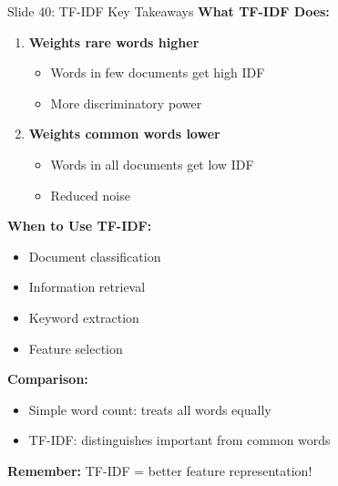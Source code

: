 \documentclass[8pt]{beamer}
\begin{document}
	\begin{frame}{Slide 40: TF-IDF Key Takeaways}
		\fontsize{6.5}{7.5}\selectfont
		\textbf{What TF-IDF Does:}
		\begin{enumerate}
			\item \textbf{Weights rare words higher}
			\begin{itemize}
				\item Words in few documents get high IDF
				\item More discriminatory power
			\end{itemize}
			\item \textbf{Weights common words lower}
			\begin{itemize}
				\item Words in all documents get low IDF
				\item Reduced noise
			\end{itemize}
		\end{enumerate}
		
		\vspace{0.1cm}
		\textbf{When to Use TF-IDF:}
		\begin{itemize}
			\item Document classification
			\item Information retrieval
			\item Keyword extraction
			\item Feature selection
		\end{itemize}
		
		\vspace{0.1cm}
		\textbf{Comparison:}
		\begin{itemize}
			\item Simple word count: treats all words equally
			\item TF-IDF: distinguishes important from common words
		\end{itemize}
		
		\textcolor{myblue}{\textbf{Remember:}} TF-IDF = better feature representation!
	\end{frame}
	
	
\end{document}
